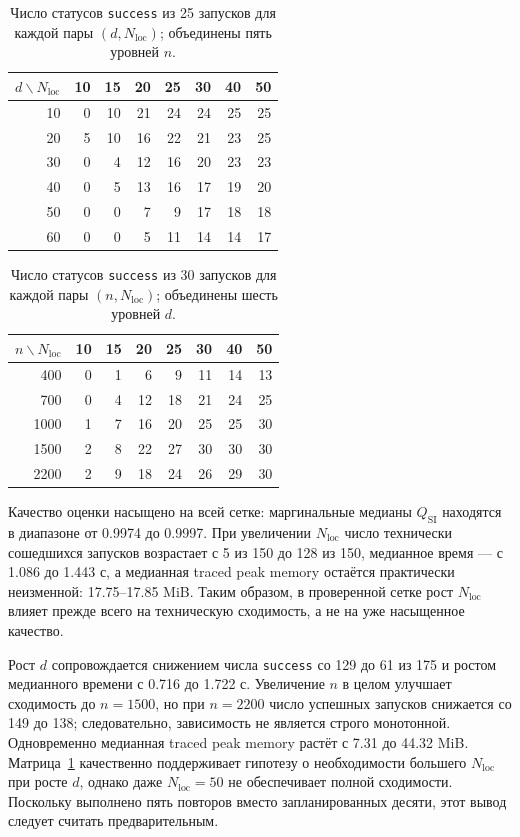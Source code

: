 \documentclass[11pt,a4paper]{article}
\newcommand{\code}[1]{\texttt{#1}}
\newcommand{\qsi}{Q_{\mathrm{SI}}}
\begin{document}
\begin{table}[ht]
\centering
\small
\begin{tabular}{r|rrrrrrr}
\hline
$d\backslash N_{\mathrm{loc}}$ & 10 & 15 & 20 & 25 & 30 & 40 & 50 \\
\hline
10 & 0 & 10 & 21 & 24 & 24 & 25 & 25 \\
20 & 5 & 10 & 16 & 22 & 21 & 23 & 25 \\
30 & 0 & 4  & 12 & 16 & 20 & 23 & 23 \\
40 & 0 & 5  & 13 & 16 & 17 & 19 & 20 \\
50 & 0 & 0  & 7  & 9  & 17 & 18 & 18 \\
60 & 0 & 0  & 5  & 11 & 14 & 14 & 17 \\
\hline
\end{tabular}
\caption{Число статусов \code{success} из 25 запусков для каждой пары
$(d,N_{\mathrm{loc}})$; объединены пять уровней $n$.}
\label{tab:si-nloc-d-matrix}
\end{table}

\begin{table}[ht]
\centering
\small
\begin{tabular}{r|rrrrrrr}
\hline
$n\backslash N_{\mathrm{loc}}$ & 10 & 15 & 20 & 25 & 30 & 40 & 50 \\
\hline
400  & 0 & 1 & 6  & 9  & 11 & 14 & 13 \\
700  & 0 & 4 & 12 & 18 & 21 & 24 & 25 \\
1000 & 1 & 7 & 16 & 20 & 25 & 25 & 30 \\
1500 & 2 & 8 & 22 & 27 & 30 & 30 & 30 \\
2200 & 2 & 9 & 18 & 24 & 26 & 29 & 30 \\
\hline
\end{tabular}
\caption{Число статусов \code{success} из 30 запусков для каждой пары
$(n,N_{\mathrm{loc}})$; объединены шесть уровней $d$.}
\label{tab:si-nloc-n-matrix}
\end{table}

Качество оценки насыщено на всей сетке: маргинальные медианы $\qsi$
находятся в диапазоне от 0.9974 до 0.9997. При увеличении
$N_{\mathrm{loc}}$ число технически сошедшихся запусков возрастает с 5 из
150 до 128 из 150, медианное время --- с 1.086 до 1.443 с, а медианная
traced peak memory остаётся практически неизменной: 17.75--17.85 MiB.
Таким образом, в проверенной сетке рост $N_{\mathrm{loc}}$ влияет прежде
всего на техническую сходимость, а не на уже насыщенное качество.

Рост $d$ сопровождается снижением числа \code{success} со 129 до 61 из 175
и ростом медианного времени с 0.716 до 1.722 с. Увеличение $n$ в целом
улучшает сходимость до $n=1500$, но при $n=2200$ число успешных запусков
снижается со 149 до 138; следовательно, зависимость не является строго
монотонной. Одновременно медианная traced peak memory растёт с 7.31 до
44.32 MiB. Матрица~\ref{tab:si-nloc-d-matrix} качественно поддерживает
гипотезу о необходимости большего $N_{\mathrm{loc}}$ при росте $d$, однако
даже $N_{\mathrm{loc}}=50$ не обеспечивает полной сходимости. Поскольку
выполнено пять повторов вместо запланированных десяти, этот вывод следует
считать предварительным.
\end{document}
